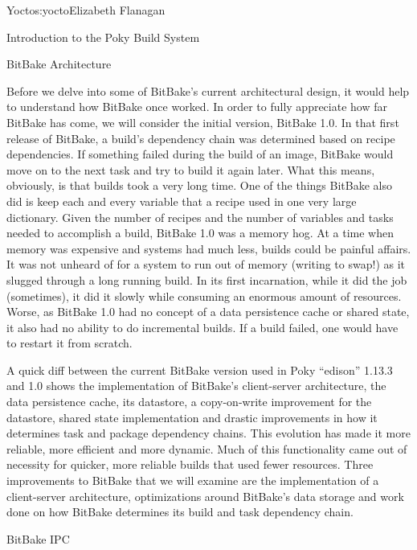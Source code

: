 \begin{aosachapter}{Yocto}{s:yocto}{Elizabeth Flanagan}
\begin{aosasect1}{Introduction to the Poky Build System}
\end{aosasect1}

\begin{aosasect1}{BitBake Architecture}

Before we delve into some of BitBake's current architectural design,
it would help to understand how BitBake once worked. In
order to fully appreciate how far BitBake has come, we will consider the
initial version, BitBake 1.0. In that first release of BitBake, a
build's dependency chain was determined based on recipe
dependencies. If something failed during the build of an image,
BitBake would move on to the next task and try to build it again later.
What this means, obviously, is that builds took a very long time. One
of the things BitBake also did is keep each and every variable that a
recipe used in one very large dictionary. Given the number of recipes
and the number of variables and tasks needed to accomplish a build,
BitBake 1.0 was a memory hog. At a time when memory was expensive and
systems had much less, builds could be painful affairs. It was not
unheard of for a system to run out of memory (writing to swap!)  as it
slugged through a long running build. In its first incarnation, while
it did the job (sometimes), it did it slowly while consuming an enormous
amount of resources. Worse, as BitBake 1.0 had no concept of a data persistence
cache or shared state, it also had no ability to do incremental
builds. If a build failed, one would have to restart it from
scratch.

A quick diff between the current BitBake version used in Poky
``edison'' 1.13.3 and 1.0 shows the implementation of BitBake's
client-server architecture, the data persistence cache, its datastore,
a copy-on-write improvement for the datastore, shared state
implementation and drastic improvements in how it determines task
and package dependency chains. This evolution has made it more
reliable, more efficient and more dynamic. Much of this functionality
came out of necessity for quicker, more reliable builds that used fewer
resources. Three improvements to BitBake that we will examine are the
implementation of a client-server architecture, optimizations around
BitBake's data storage and work done on how BitBake determines its
build and task dependency chain.

\begin{aosasect2}{BitBake IPC}


\end{aosasect2}
\end{aosasect1}
\end{aosachapter}
